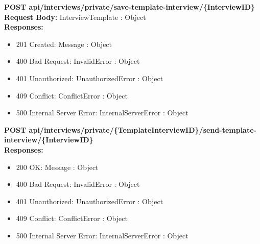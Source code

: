 \noindent\textbf{\color{titleColor}POST api/interviews/private/save-template-interview/\{InterviewID\}}
\vspace{2pt}
\\\textbf{\color{titleColor}Request Body:} InterviewTemplate : Object 
\vspace{4pt}
\\\textbf{\color{titleColor}Responses:} 
\begin{itemize}
    \item {\color{titleColor}201 Created:} Message : Object
    \item {\color{titleColor}400 Bad Request:} InvalidError : Object
    \item {\color{titleColor}401 Unauthorized:} UnauthorizedError : Object
    \item {\color{titleColor}409 Conflict:} ConflictError : Object
    \item {\color{titleColor}500 Internal Server Error:} InternalServerError : Object
\end{itemize}
\vspace{10pt}
\noindent{\color{titleColor}\rule{0.8\linewidth}{0.2mm}}
\vspace{10pt}

\noindent\textbf{\color{titleColor}POST api/interviews/private/\{TemplateInterviewID\}/send-template-interview/\{InterviewID\}}
\vspace{2pt}
\\\textbf{\color{titleColor}Responses:} 
\begin{itemize}
    \item {\color{titleColor}200 OK:} Message : Object
    \item {\color{titleColor}400 Bad Request:} InvalidError : Object
    \item {\color{titleColor}401 Unauthorized:} UnauthorizedError : Object
    \item {\color{titleColor}409 Conflict:} ConflictError : Object
    \item {\color{titleColor}500 Internal Server Error:} InternalServerError : Object
\end{itemize}
\vspace{10pt}
\noindent{\color{titleColor}\rule{0.8\linewidth}{0.2mm}}
\vspace{10pt}


